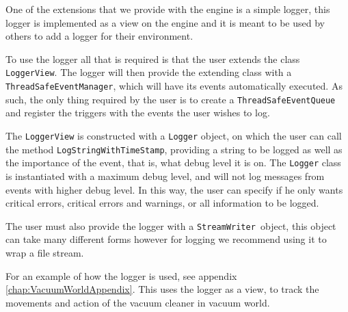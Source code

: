 One of the extensions that we provide with the engine is a simple
logger, this logger is implemented as a view on the engine and it
is meant to be used by others to add a logger for their environment.

To use the logger all that is required is that the user extends the
class \texttt{LoggerView}. The logger will then provide the extending
class with a \texttt{ThreadSafeEventManager}, which will have its
events automatically executed. As such, the only thing required by
the user is to create a \texttt{ThreadSafeEventQueue }and register
the triggers with the events the user wishes to log. 

The \texttt{LoggerView} is constructed with a \texttt{Logger} object,
on which the user can call the method \texttt{LogStringWithTimeStamp},
providing a string to be logged as well as the importance of the event,
that is, what debug level it is on. The \texttt{Logger} class is instantiated
with a maximum debug level, and will not log messages from events
with higher debug level. In this way, the user can specify if he only
wants critical errors, critical errors and warnings, or all information
to be logged.

The user must also provide the logger with a \texttt{StreamWriter
}object, this object can take many different forms however for logging
we recommend using it to wrap a file stream. 

For an example of how the logger is used, see appendix \ref{chap:VacuumWorldAppendix}.
This uses the logger as a view, to track the movements and action
of the vacuum cleaner in vacuum world.
